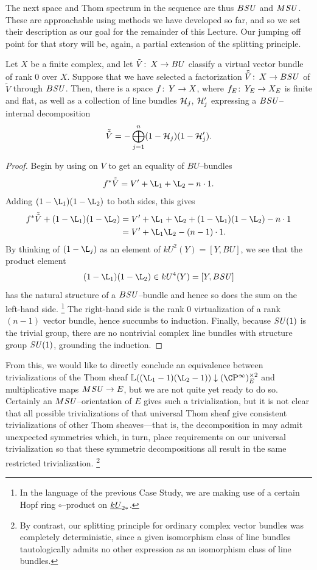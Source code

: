 The next space and Thom spectrum in the sequence are thus \(B\mathit{SU}\) and \(M\mathit{SU}\).
These are approachable using methods we have developed so far, and so we set their description as our goal for the remainder of this Lecture.
Our jumping off point for that story will be, again, a partial extension of the splitting principle.
\begin{lemma}\label{SplittingPrincipleForBSU}
Let \(X\) be a finite complex, and let \(\tilde V\colon\thinspace X \to BU\) classify a virtual vector bundle of rank \(0\) over \(X\).
Suppose that we have selected a factorization \(\tilde{\tilde V}\colon\thinspace X \to B\mathit{SU}\) of \(\tilde V\) through \(B\mathit{SU}\).
Then, there is a space \(f\colon\thinspace Y \to X\), where \(f_E\colon\thinspace Y_E \to X_E\) is finite and flat, as well as a collection of line bundles \(\mathcal{H}_j\), \(\mathcal{H}'_j\) expressing a \(B\mathit{SU}\)--internal decomposition \[\tilde{\tilde V} = -\bigoplus_{j=1}^n (1 - \mathcal{H}_j)(1 - \mathcal{H}'_j).\]
\end{lemma}
\begin{proof}
Begin by using  on \(V\) to get an equality of \(BU\)--bundles \[f^* \tilde{\tilde V} = V' + \L_1 + \L_2 - n \cdot 1.\]
Adding \((1 - \L_1)(1 - \L_2)\) to both sides, this gives
\begin{align*}
f^* \tilde{\tilde V} + (1 - \L_1)(1 - \L_2) & = V' + \L_1 + \L_2 + (1 - \L_1)(1 - \L_2) - n \cdot 1 \\
& = V' + \L_1\L_2 - (n-1) \cdot 1.
\end{align*}
By thinking of \((1 - \L_j)\) as an element of \(kU^2(Y) = [Y, BU]\), we see that the product element \[(1 - \L_1)(1 - \L_2) \in kU^4(Y) = [Y, B\SU]\] has the natural structure of a \(B\mathit{SU}\)--bundle and hence so does the sum on the left-hand side.%
\footnote{%
In the language of the previous Case Study, we are making use of a certain Hopf ring \(\circ\)--product on \(\OS{kU}{2*}\).
}
The right-hand side is the rank \(0\) virtualization of a rank \((n-1)\) vector bundle, hence succumbs to induction.
Finally, because \(\mathit{SU}(1)\) is the trivial group, there are no nontrivial complex line bundles with structure group \(\mathit{SU}(1)\), grounding the induction.
\end{proof}

From this, we would like to directly conclude an equivalence between trivializations of the Thom sheaf \(\ThomSheaf{(\L_1 - 1)(\L_2 - 1)} \downarrow (\CP^\infty)^{\times 2}_E\) and multiplicative maps \(M\mathit{SU} \to E\), but we are not quite yet ready to do so.
Certainly an \(M\mathit{SU}\)--orientation of \(E\) gives such a trivialization, but it is not clear that all possible trivializations of that universal Thom sheaf give consistent trivializations of other Thom sheaves---that is, the decomposition in  may admit unexpected symmetries which, in turn, place requirements on our universal trivialization so that these symmetric decompositions all result in the same restricted trivialization.%
\footnote{%
By contrast, our splitting principle for ordinary complex vector bundles was completely deterministic, since a given isomorphism class of line bundles tautologically admits no other expression as an isomorphism class of line bundles.
}

